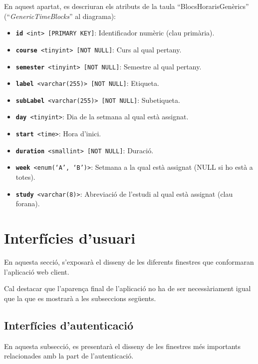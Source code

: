 \documentclass[a4paper,12pt]{ThesisStyle}
\begin{document}
En aquest apartat, es descriuran els atributs de la taula ``BlocsHorarisGenèrics'' (``\textit{GenericTimeBlocks}'' al diagrama):
\begin{itemize}
  \item \texttt{\textbf{id} <int> [PRIMARY KEY]}: Identificador numèric (clau primària).
  \item \texttt{\textbf{course} <tinyint> [NOT NULL]}: Curs al qual pertany.
  \item \texttt{\textbf{semester} <tinyint> [NOT NULL]}: Semestre al qual pertany.
  \item \texttt{\textbf{label} <varchar(255)> [NOT NULL]}: Etiqueta.
  \item \texttt{\textbf{subLabel} <varchar(255)> [NOT NULL]}: Subetiqueta.
  \item \texttt{\textbf{day} <tinyint>}: Dia de la setmana al qual està assignat.
  \item \texttt{\textbf{start} <time>}: Hora d'inici.
  \item \texttt{\textbf{duration} <smallint> [NOT NULL]}: Duració.
  \item \texttt{\textbf{week} <enum(`A', `B')>}: Setmana a la qual està assignat (NULL si ho està a totes).
  \item \texttt{\textbf{study} <varchar(8)>}: Abreviació de l'estudi al qual està assignat (clau forana).
\end{itemize}

\section{Interfícies d'usuari}
\label{sec:interficies_usuari}

En aquesta secció, s'exposarà el disseny de les diferents finestres que conformaran l'aplicació web client.

Cal destacar que l'aparença final de l'aplicació no ha de ser necessàriament igual que la que es mostrarà a les subseccions següents.

\subsection{Interfícies d'autenticació}
\label{subsec:interficies_auth}

En aquesta subsecció, es presentarà el disseny de les finestres més importants relacionades amb la part de l'autenticació.
\end{document}

